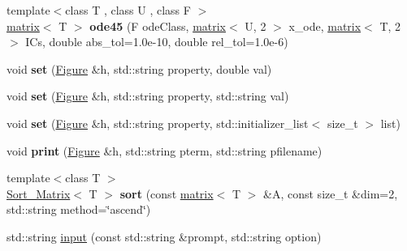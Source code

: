 \begin{DoxyCompactItemize}
\item 
\hypertarget{namespacekeycpp_aeea0edbbd76794e73bfade1d428f5dd7}{{\footnotesize template$<$class T , class U , class F $>$ }\\\hyperlink{classkeycpp_1_1matrix}{matrix}$<$ T $>$ {\bfseries ode45} (F ode\-Class, \hyperlink{classkeycpp_1_1matrix}{matrix}$<$ U, 2 $>$ x\-\_\-ode, \hyperlink{classkeycpp_1_1matrix}{matrix}$<$ T, 2 $>$ I\-Cs, double abs\-\_\-tol=1.\-0e-\/10, double rel\-\_\-tol=1.\-0e-\/6)}\label{namespacekeycpp_aeea0edbbd76794e73bfade1d428f5dd7}

\item 
\hypertarget{namespacekeycpp_afcd6ae07fc18f5374868fe314f00108c}{void {\bfseries set} (\hyperlink{classkeycpp_1_1_figure}{Figure} \&h, std\-::string property, double val)}\label{namespacekeycpp_afcd6ae07fc18f5374868fe314f00108c}

\item 
\hypertarget{namespacekeycpp_a53fd8f41e3cdddb0dcca913eef5ee329}{void {\bfseries set} (\hyperlink{classkeycpp_1_1_figure}{Figure} \&h, std\-::string property, std\-::string val)}\label{namespacekeycpp_a53fd8f41e3cdddb0dcca913eef5ee329}

\item 
\hypertarget{namespacekeycpp_ae67eb981ff22ef79a4ee90a9a40ae21f}{void {\bfseries set} (\hyperlink{classkeycpp_1_1_figure}{Figure} \&h, std\-::string property, std\-::initializer\-\_\-list$<$ size\-\_\-t $>$ list)}\label{namespacekeycpp_ae67eb981ff22ef79a4ee90a9a40ae21f}

\item 
\hypertarget{namespacekeycpp_af9dec3da4533a1db21a6c6c4fe8e740a}{void {\bfseries print} (\hyperlink{classkeycpp_1_1_figure}{Figure} \&h, std\-::string pterm, std\-::string pfilename)}\label{namespacekeycpp_af9dec3da4533a1db21a6c6c4fe8e740a}

\item 
\hypertarget{namespacekeycpp_a82fb697518c456560dea0b328e693418}{{\footnotesize template$<$class T $>$ }\\\hyperlink{structkeycpp_1_1_sort___matrix}{Sort\-\_\-\-Matrix}$<$ T $>$ {\bfseries sort} (const \hyperlink{classkeycpp_1_1matrix}{matrix}$<$ T $>$ \&A, const size\-\_\-t \&dim=2, std\-::string method=\char`\"{}ascend\char`\"{})}\label{namespacekeycpp_a82fb697518c456560dea0b328e693418}

\item 
\hypertarget{namespacekeycpp_aba69db64fe38ad271de1939d3f1a5520}{std\-::string \hyperlink{namespacekeycpp_aba69db64fe38ad271de1939d3f1a5520}{input} (const std\-::string \&prompt, std\-::string option)}\label{namespacekeycpp_aba69db64fe38ad271de1939d3f1a5520}


\end{DoxyCompactItemize}

